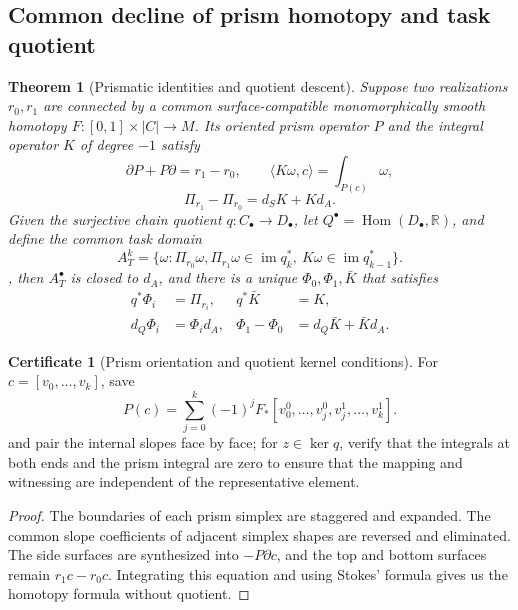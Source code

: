 \documentclass[11pt,a4paper]{article}
\theoremstyle{plain}
\newtheorem{theorem}{Theorem}[section]
\theoremstyle{definition}
\newtheorem*{certificate}{Certificate}
\theoremstyle{remark}
\begin{document}
\begin{CJK*}
\subsection { Common decline of prism homotopy and task quotient }

\begin{theorem}
[Prismatic identities and quotient descent]\label{pc:homotopy-descent}
Suppose two realizations $r_0,r_1$ are connected by a common surface-compatible monomorphically smooth homotopy $F:[0,1]\times|C|\to M$. Its oriented prism operator $P$ and the integral operator $K$ of degree $-1$ satisfy \[
 \partial P+P\partial=r_1-r_0,\qquad
 \langle K\omega,c\rangle=\int_{P(c)}\omega,
\] \[
 \Pi_{r_1}-\Pi_{r_0}=d_SK+Kd_A.
\] Given the surjective chain quotient $q:C_\bullet\to D_\bullet$, let $Q^\bullet=\operatorname{Hom}(D_\bullet,\mathbb R)$, and define the common task domain \[
 A_T^k=\{\omega:\Pi_{r_0}\omega,\Pi_{r_1}\omega\in\operatorname{im}q_k^*,
                         \ K\omega\in\operatorname{im}q_{k-1}^*\}.
\], then $A_T^\bullet$ is closed to $d_A$, and there is a unique $\Phi_0,\Phi_1,\bar K$ that satisfies \begin{equation}
\label{pc:eq-main}
\begin{aligned}
 q^*\Phi_i&=\Pi_{r_i},& q^*\bar K&=K,\\
 d_Q\Phi_i&=\Phi_i d_A,&
 \Phi_1-\Phi_0&=d_Q\bar K+\bar Kd_A.
\end{aligned}
\end{equation}\end{theorem}
\begin{certificate}
[Prism orientation and quotient kernel conditions]For $c=[v_0,\ldots,v_k]$, save \[
 P(c)=\sum_{j=0}^k(-1)^j
 F_*[v_0^0,\ldots,v_j^0,v_j^1,\ldots,v_k^1].
\] and pair the internal slopes face by face; for $z\in\ker q$, verify that the integrals at both ends and the prism integral are zero to ensure that the mapping and witnessing are independent of the representative element.\end{certificate}
\begin{proof}
The boundaries of each prism simplex are staggered and expanded. The common slope coefficients of adjacent simplex shapes are reversed and eliminated. The side surfaces are synthesized into $-P\partial c$, and the top and bottom surfaces remain $r_1c-r_0c$. Integrating this equation and using Stokes' formula gives us the homotopy formula without quotient.


\end{proof}
\end{CJK*}
\end{document}
